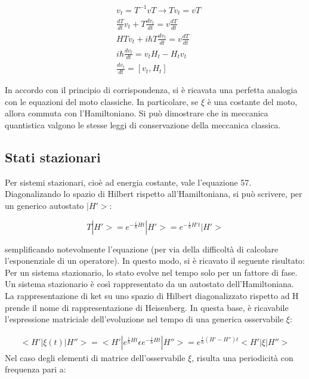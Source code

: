 \documentclass{article}
\begin{document}
\begin{equation}
    \begin{aligned}
        & v_t=T^{-1}vT \rightarrow Tv_t= vT \\
        & \frac{dT}{dt}v_t+T\frac{dv_t}{dt}= v\frac{dT}{dt} \\
        & HTv_t+i\hbar T \frac{d v_t}{dt}=v\frac{dT}{dt} \\
        & i\hbar \frac{dv_t}{dt}=v_tH_t-H_tv_t \\
        & \frac{dv_t}{dt}=[v_t, H_t]
    \end{aligned}
\end{equation}

In accordo con il principio di corrispondenza, si è ricavata una perfetta analogia con le equazioni del moto classiche.
In particolare, se $\xi$ è una costante del moto, allora commuta con l'Hamiltoniano.
Si può dimostrare che in meccanica quantistica valgono le stesse leggi di conservazione della meccanica classica.

\subsection{Stati stazionari}
Per sistemi stazionari, cioè ad energia costante, vale l'equazione 57.
Diagonalizando lo spazio di Hilbert rispetto all'Hamiltoniana, si può scrivere, per un generico autostato $|H'>$:

\begin{equation}
    T |H'>= e^{-\frac{i}{\hbar}Ht}|H'>= e^{-\frac{i}{\hbar}H't}|H'>
\end{equation}

semplificando notevolmente l'equazione (per via della difficoltà di calcolare l'esponenziale di un operatore).
In questo modo, si è ricavato il seguente risultato: Per un sistema stazionario, lo stato evolve nel tempo solo per un fattore di fase.
Un sistema stazionario è così rappresentato da un autostato dell'Hamiltoniana.
La rappresentazione di ket su uno spazio di Hilbert diagonalizzato rispetto ad H prende il nome di rappresentazione di Heisenberg.
In questa base, è ricavabile l'espressione matriciale dell'evoluzione nel tempo di una generica osservabile $\xi$:

\begin{equation}
    \begin{aligned}
        <H'|\xi(t)|H''>=<H'|e^{\frac{i}{\hbar}Ht}\epsilon e^{-\frac{i}{\hbar}Ht}|H''>=e^{\frac{i}{\hbar}(H'-H'')t}<H'|\xi|H''>
    \end{aligned}
\end{equation}
Nel caso degli elementi di matrice dell'osservabile $\xi$, risulta una periodicità con frequenza pari a:
\end{document}
